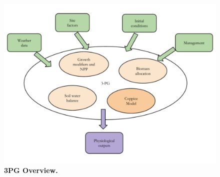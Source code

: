 \documentclass[10pt]{article}
\begin{document}
\begin{figure}%
\ifdefined\SHOWFIGS
\includegraphics[width=\linewidth]{model_overview}
\fi
\caption{ { \bf 3PG Overview. } }
\label{fig:growth-model}
\end{figure}
\end{document}
